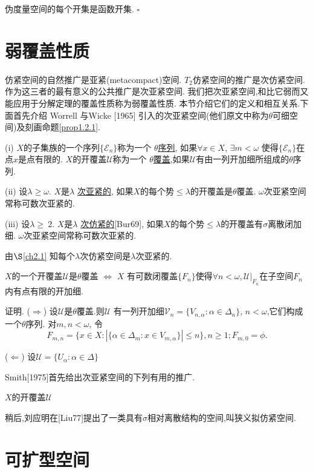 \documentclass[main.tex]{subfiles}
\begin{document}
\begin{fact}
伪度量空间的每个开集是函数开集. $\square$
\end{fact}

\section{弱覆盖性质}\label{ch1.2}
仿紧空间的自然推广是亚紧(metacompact)空间.
$T_2$仿紧空间的推广是次仿紧空间.
作为这三者的最有意义的公共推广是次亚紧空间.
我们把次亚紧空间,和比它弱而又能应用于分解定理的覆盖性质称为弱覆盖性质.
本节介绍它们的定义和相互关系.下面首先介绍 Worrell 与Wicke [1965] 引入的次亚紧空间(他们原文中称为$\theta$可细空间)及刻画命题\ref{prop1.2.1}.


\begin{definition}
\textnormal{(i)} $X$的子集族的一个序列$\{\mathscr{E}_n\}$称为一个
\underline{$\theta$序列},
如果$\forall x\in X$, $ \exists m < \omega$ 使得$\{\mathscr{E}_n\}$在点$x$是点有限的.
$X$的开覆盖$\mathscr{U}$称为一个 \underline{$\theta$覆盖},如果$\mathscr{U}$有由一列开加细所组成的$\theta$序列.

\textnormal{(ii)} 设$\lambda\ge\omega$. $X$是$\lambda$ \underline{次亚紧的},
如果$X$的每个势$\le\lambda$的开覆盖是$\theta$覆盖.
$\omega$次亚紧空间常称可数次亚紧的.


\textnormal{(iii)} 设$\lambda\ge\ 2$. $X$是$\lambda$ \underline{次仿紧的}\textnormal{[Bur69]},
如果$X$的每个势$\le\lambda$的开覆盖有$\sigma$离散闭加细.
$\omega$次亚紧空间常称可数次亚紧的.
\end{definition}

由$\S$\ref{ch2.1} 知每个$\lambda$次仿紧空间是$\lambda$次亚紧的.

\begin{proposition}\label{prop1.2.1}
$X$的一个开覆盖$\mathscr{U}$是$\theta$覆盖 $\Leftrightarrow$
$X$ 有可数闭覆盖$\{F_n\}$使得$\forall n < \omega, \mathscr{U}|_{F_n}$在子空间${F_n}$内有点有限的开加细.
\end{proposition}

证明. ($\Rightarrow$) 设$\mathscr{U}$是$\theta$覆盖.则$\mathscr{U}$
有一列开加细$\mathscr{V}_n = \{V_{n,\alpha}: \alpha\in \Delta_n\}$,
$n<\omega$,它们构成一个$\theta$序列.
对$m,n<\omega$, 令
$$F_{m,n}=\{x\in X: |\{\alpha\in\Delta_m: x\in V_{m,\alpha}\}|\le n\}, n\ge 1; F_{m,0} = \phi.$$

($\Leftarrow$) 设$\mathscr{U} = \{ U_\alpha: \alpha\in\Delta\}$

Smith[1975]首先给出次亚紧空间的下列有用的推广.
\begin{definition}
$X$的开覆盖$\mathscr{U}$
\end{definition}

稍后,刘应明在[Liu77]提出了一类具有$\sigma$相对离散结构的空间,叫狭义拟仿紧空间.


\section{可扩型空间}\label{ch1.3}
	
\end{document}
